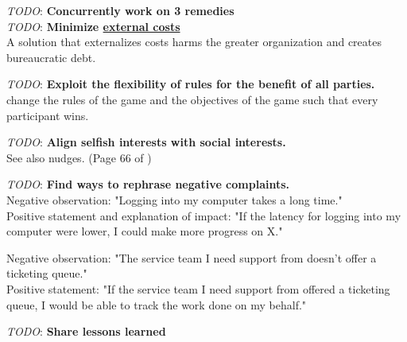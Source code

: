 \textit{TODO}: \textbf{Concurrently work on 3 remedies}\\


\textit{TODO}: \textbf{Minimize \href{https://en.wikipedia.org/wiki/Externality}{external costs}}\\
A solution that externalizes costs harms the greater organization and creates bureaucratic debt.


\textit{TODO}: \textbf{Exploit the flexibility of rules for the benefit of all parties.}\\
change the rules of the game and the objectives of the game such that every participant wins.

\textit{TODO}: \textbf{Align selfish interests with social interests.}\\
See also nudges. 
(Page 66 of \cite{2012_Schneier})

\textit{TODO}: \textbf{Find ways to rephrase negative complaints.}\\
Negative observation: "Logging into my computer takes a long time."\\
Positive statement and explanation of impact: "If the latency for logging into my computer were lower, I could make more progress on X."


Negative observation: "The service team I need support from doesn't offer a ticketing queue."\\
Positive statement: "If the service team I need support from offered a ticketing queue, I would be able to track the work done on my behalf."

\textit{TODO}: \textbf{Share lessons learned}\\
